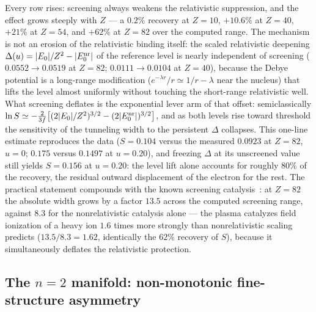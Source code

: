 \documentclass[aps,pra,twocolumn,superscriptaddress,floatfix,longbibliography]{revtex4-2}
\begin{document}
Every row rises: screening always weakens the relativistic
suppression, and the effect grows steeply with $Z$ --- a $0.2\%$
recovery at $Z=10$, $+10.6\%$ at $Z=40$, $+21\%$ at $Z=54$, and
$+62\%$ at $Z=82$ over the computed range. The mechanism is not an
erosion of the relativistic binding itself: the scaled relativistic
deepening $\Delta(u)=|E_0|/Z^{2}-|E_0^{\rm nr}|$ of the reference
level is nearly independent of screening ($0.0552\to0.0519$ at
$Z=82$; $0.0111\to0.0104$ at $Z=40$), because the Debye potential is
a long-range modification ($e^{-\lambda r}/r\simeq1/r-\lambda$ near
the nucleus) that lifts the level almost uniformly without touching
the short-range relativistic well. What screening deflates is the
exponential lever arm of that offset: semiclassically $\ln S\simeq
-\tfrac{2}{3f}\bigl[(2|E_0|/Z^{2})^{3/2}-(2|E_0^{\rm
nr}|)^{3/2}\bigr]$, and as both levels rise toward threshold the
sensitivity of the tunneling width to the persistent $\Delta$
collapses. This one-line estimate reproduces the data ($S=0.104$
versus the measured $0.0923$ at $Z=82$, $u=0$; $0.175$ versus
$0.1497$ at $u=0.20$), and freezing $\Delta$ at its unscreened value
still yields $S=0.156$ at $u=0.20$: the level lift alone accounts
for roughly $80\%$ of the recovery, the residual outward
displacement of the electron for the rest. The practical statement
compounds with the known screening
catalysis~\cite{YuHo2005,companionD}: at $Z=82$ the absolute width
grows by a factor $13.5$ across the computed screening range,
against $8.3$ for the nonrelativistic catalysis alone --- the
plasma catalyzes field ionization of a heavy ion $1.6$ times more
strongly than nonrelativistic scaling predicts ($13.5/8.3=1.62$,
identically the $62\%$ recovery of $S$), because it simultaneously
deflates the relativistic protection.

\subsection{The $n=2$ manifold: non-monotonic fine-structure
asymmetry}
\end{document}
